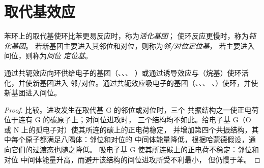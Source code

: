 \section{取代基效应}

\begin{definition}[定位基]\label{def:b2:aromatic-substitution:directing}
苯环上的取代基使环比苯更易反应时，称为\emph{活化基团}；
使环反应更慢时，称为\emph{钝化基团}。
若新基团主要进入其邻位和对位，则称为\emph{邻/对位定位基}，
若主要进入间位，则称为\emph{间位
定位基}。
\end{definition}

\begin{proposition}[给电子基团与吸电子基团]\label{prop:b2:aromatic-substitution:directing}
通过共轭效应向环供给电子的基团（、、、
）或通过诱导效应与（烷基）使环活化，并使新基团进入
邻/对位。通过共轭效应吸电子的基团（、、、
、）使环，并使新基团进入间位。
\end{proposition}

\begin{proof}
比较。进攻发生在取代基 G 的邻位或对位时，三个
共振结构之一使正电荷位于连有 G 的碳原子上；对间位进攻时，
三个结构均不如此。给电子基 G（O 或 N 上的孤电子对）使其所连的碳上的正电荷稳定，
并增加第四个共振结构，其中每个原子都满足八隅体：邻位和对位的
中间体能量降低，根据哈蒙德假设，通向它们的过渡态也随之降低。
吸电子基 G 使其所连碳上的正电荷不稳定：邻位和对位
中间体能量升高，而避开该结构的间位进攻所受不利最小，
但仍慢于苯。
\end{proof}

